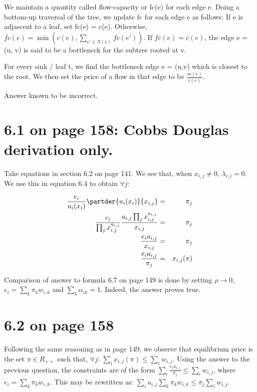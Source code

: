 \documentclass[10pt]{amsart}
\begin{document}
We maintain a quantity called flow-capacity or fc(e) for each edge e. Doing a bottom-up traversal of the tree, we update fc for each edge e as follows: If e is adjascent to a leaf, set fc(e) = c(e). Otherwise, $fc(e) = \min(c(e), \sum_{e' \in N(e)}fc(e'))$. If $fc(e) = c(e)$, the edge e = (u, v) is said to be a bottleneck for the subtree rooted at v.

For every sink / leaf t, we find the bottleneck edge e = (u,v) which is closest to the root. We then set the price of a flow in that edge to be $\frac{m(v)}{c(e)}$.

\begin{rem}
 Answer known to be incorrect.
\end{rem}

\section{6.1 on page 158: Cobbs Douglas derivation only.}
Take equations in section 6.2 on page 141. We see that, when $x_{i,j}\neq 0$, $\lambda_{i,j} = 0$. We use this in equation 6.4 to obtain $\forall j$:

\begin{eqnarray*}
\frac{e_{i}}{u_{i}(x_{i})}\partder{u_{i}(x_{i})}{x_{i,j}} &=& \pi_{j} \\
\frac{e_{i}}{\prod_{j}x_{i,j}^{a_{i, j}}} \frac{a_{i,j}\prod_{j}x_{i,j}^{a_{i, j}}}{x_{i,j}}&=& \pi_{j}\\
\frac{e_{i}a_{i,j}}{x_{i,j}}&=& \pi_{j}\\
\frac{e_{i}a_{i,j}}{\pi_{j}}&=& x_{i,j}(\pi)\\
\end{eqnarray*}


\begin{rem}
Comparison of answer to formula 6.7 on page 149 is done by setting $\rho \to 0$, $e_{i} = \sum_{k}\pi_{k}w_{i,k}$ and $\sum_{k}\alpha_{ik} = 1$. Indeed, the answer proves true.
\end{rem}


\section{6.2 on page 158}
Following the same reasoning as in page 149, we observe that equilibrium price is the set $\pi \in R_{++}$ such that, $\forall j$: $\sum_{i}x_{i,j}(\pi) \leq \sum_{i}w_{i,j}$. Using the answer to the previous question, the constraints are of the form  $\sum_{i}\frac{e_{i}a_{i,j}}{\pi_{j}} \leq \sum_{i}w_{i,j}$, where  $e_{i} = \sum_{k} \pi_{k} w_{i,k}$. This may be rewritten as: $\sum_{i}a_{i,j}\sum_{k} \pi_{k} w_{i,k} \leq \pi_{j}\sum_{i}w_{i,j}$.
\end{document}
